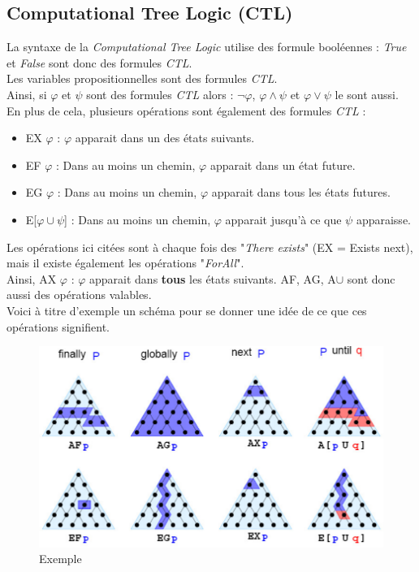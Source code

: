 \documentclass[runningheads,a4paper]{llncs}
\begin{document}
\subsection{Computational Tree Logic (CTL)}

La syntaxe de la \textit{Computational Tree Logic} utilise des formule booléennes : \textit{True} et \textit{False} sont donc des formules \textit{CTL}.\\
Les variables propositionnelles sont des formules \textit{CTL}.\\
Ainsi, si $\varphi$ et $\psi$ sont des formules \textit{CTL} alors : $\lnot \varphi$, $\varphi \land \psi$ et $\varphi \lor \psi$ le sont aussi.\\

\noindent En plus de cela, plusieurs opérations sont également des formules \textit{CTL} : 

\begin{itemize}
\item EX $\varphi$ : $\varphi$ apparait dans un des états suivants.
\item EF $\varphi$ : Dans au moins un chemin, $\varphi$ apparait dans un état future.
\item EG $\varphi$ : Dans au moins un chemin, $\varphi$ apparait dans tous les états futures.
\item E[$\varphi \cup \psi$] : Dans au moins un chemin, $\varphi$ apparait jusqu'à ce que $\psi$ apparaisse. \\
\end{itemize}


\noindent Les opérations ici citées sont à chaque fois des "\textit{There exists}" (EX = Exists next), mais il existe également les opérations "\textit{ForAll}". \\
Ainsi, AX $\varphi$ : $\varphi$ apparait dans \textbf{tous} les états suivants.
AF, AG, A$\cup$ sont donc aussi des opérations valables.\\

\noindent Voici à titre d'exemple un schéma pour se donner une idée de ce que ces opérations signifient.

\begin{figure}[!h]
	\includegraphics[scale=0.4]{liveness.png}
	\centering
	\caption{Exemple}
	\label{label-image5}
\end{figure}
\end{document}
